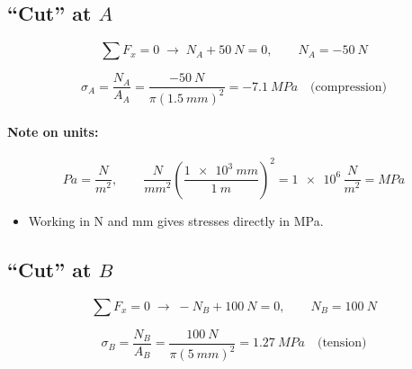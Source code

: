 \documentclass[11pt]{article}
\begin{document}
\subsection*{``Cut'' at $A$}

\noindent
\begin{minipage}[c]{0.45\textwidth}
\centering
{}
\end{minipage}%
\hfill
\begin{minipage}[c]{0.52\textwidth}
\[
  \textstyle\sum F_x = 0 \;\rightarrow\; N_A + \SI{50}{N} = 0, \qquad N_A = -\SI{50}{N}
\]
\end{minipage}

\[
  \boxed{\sigma_A = \frac{N_A}{A_A} = \frac{-\SI{50}{N}}{\pi(\SI{1.5}{mm})^2}
         = -\SI{7.1}{MPa}} \quad \text{(compression)}
\]

\paragraph{Note on units:}
\[
  \si{Pa} = \frac{\si{N}}{\si{m^2}}, \qquad
  \frac{\si{N}}{\si{mm^2}}\left(\frac{\SI{1e3}{mm}}{\SI{1}{m}}\right)^2
  = \num{1e6}\,\frac{\si{N}}{\si{m^2}} = \si{MPa}
\]
\begin{itemize}[label=\then]
  \item Working in \si{N} and \si{mm} gives stresses directly in \si{MPa}.
\end{itemize}

\subsection*{``Cut'' at $B$}

\noindent
\begin{minipage}[c]{0.45\textwidth}
\centering
{}
\end{minipage}%
\hfill
\begin{minipage}[c]{0.52\textwidth}
\[
  \textstyle\sum F_x = 0 \;\rightarrow\; -N_B + \SI{100}{N} = 0, \qquad N_B = \SI{100}{N}
\]
\end{minipage}

\[
  \boxed{\sigma_B = \frac{N_B}{A_B} = \frac{\SI{100}{N}}{\pi(\SI{5}{mm})^2}
         = \SI{1.27}{MPa}} \quad \text{(tension)}
\]
\end{document}
